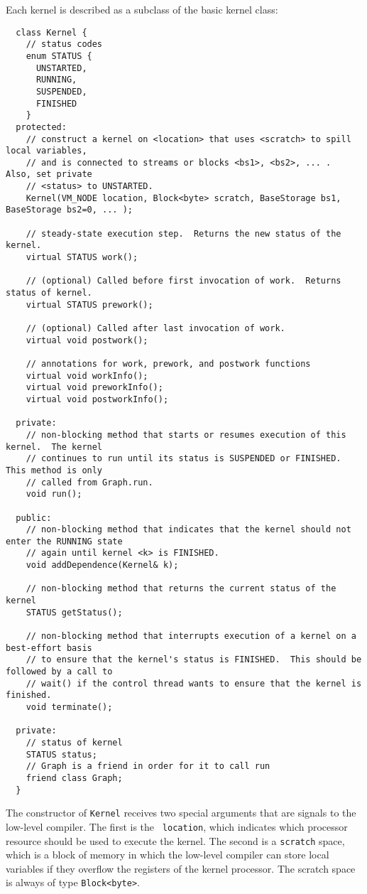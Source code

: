 \label{sec:kernels}

Each kernel is described as a subclass of the basic kernel class:
{\small
\begin{verbatim}
  class Kernel {
    // status codes
    enum STATUS {
      UNSTARTED,
      RUNNING,
      SUSPENDED,
      FINISHED
    }
  protected:
    // construct a kernel on <location> that uses <scratch> to spill local variables,
    // and is connected to streams or blocks <bs1>, <bs2>, ... .  Also, set private 
    // <status> to UNSTARTED.
    Kernel(VM_NODE location, Block<byte> scratch, BaseStorage bs1, BaseStorage bs2=0, ... );

    // steady-state execution step.  Returns the new status of the kernel.
    virtual STATUS work();

    // (optional) Called before first invocation of work.  Returns status of kernel.
    virtual STATUS prework();

    // (optional) Called after last invocation of work.
    virtual void postwork();

    // annotations for work, prework, and postwork functions
    virtual void workInfo();
    virtual void preworkInfo();
    virtual void postworkInfo();

  private:
    // non-blocking method that starts or resumes execution of this kernel.  The kernel 
    // continues to run until its status is SUSPENDED or FINISHED.  This method is only
    // called from Graph.run.
    void run();
   
  public:
    // non-blocking method that indicates that the kernel should not enter the RUNNING state
    // again until kernel <k> is FINISHED.
    void addDependence(Kernel& k);

    // non-blocking method that returns the current status of the kernel
    STATUS getStatus();

    // non-blocking method that interrupts execution of a kernel on a best-effort basis 
    // to ensure that the kernel's status is FINISHED.  This should be followed by a call to 
    // wait() if the control thread wants to ensure that the kernel is finished.
    void terminate();

  private:
    // status of kernel
    STATUS status;
    // Graph is a friend in order for it to call run
    friend class Graph;
  }  
\end{verbatim}}
The constructor of {\tt Kernel} receives two special arguments that
are signals to the low-level compiler.  The first is the {\tt
location}, which indicates which processor resource should be used to
execute the kernel.  The second is a {\tt scratch} space, which is a
block of memory in which the low-level compiler can store local
variables if they overflow the registers of the kernel processor.  The
scratch space is always of type {\tt Block<byte>}.

